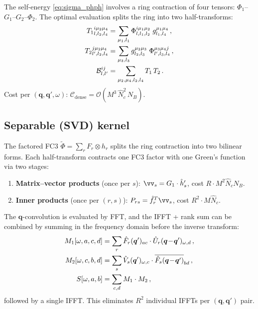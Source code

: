 \documentclass[11pt]{article}
\newcommand{\vc}[1]{\bm{#1}}
\newcommand{\vq}{\vc{q}}
\newcommand{\cO}{\mathcal{O}}
\newcommand{\cC}{\mathcal{C}}
\begin{document}
The self-energy \cref{eq:sigma_phph} involves a ring contraction of
four tensors: $\Phi_1$--$G_1$--$G_2$--$\Phi_2$.  The optimal
evaluation splits the ring into two half-transforms:
\begin{align}
  {T_1}^{i\mu_2\mu_4}_{l,l_2,l_4}
  &= \sum_{\mu_1,l_1}
     \Phi^{i\mu_1\mu_2}_{l,l_1,l_2}\;g^{\mu_1\mu_4}_{l_1,l_4}\,,
  \notag\\
  {T_2}^{j\mu_2\mu_4}_{l',l_2,l_4}
  &= \sum_{\mu_3,l_3}
     g^{\mu_2\mu_3}_{l_2,l_3}\;
     \Phi^{\mu_3\mu_4 j}_{l',l_3,l_4}\,,
  \notag\\
  \mathcal{B}^{ij}_{l,l'}
  &= \sum_{\mu_2,\mu_4,l_2,l_4} T_1\,T_2\,.
  \label{eq:balanced_tree}
\end{align}
Cost per $(\vq, \vq', \omega)$:
$\cC_\mathrm{dense} = \cO(M^3\,\hat{N}_c^2\,N_B)$.

\subsection{Separable (SVD) kernel}
\label{sec:sep_kernel}

The factored FC3 $\tilde\Phi = \sum_r F_r \otimes h_r$ splits the ring
contraction into two bilinear forms.  Each half-transform contracts one
FC3 factor with one Green's function via two stages:
\begin{enumerate}
  \item \textbf{Matrix--vector products} (once per $s$):
        $\vv_s = G_1 \cdot \hat{h}'_s$, cost $R \cdot M^2 \hat{N}_c N_B$.
  \item \textbf{Inner products} (once per $(r,s)$):
        $P_{rs} = \hat{f}_r^T \vv_s$, cost $R^2 \cdot M \hat{N}_c$.
\end{enumerate}
The $\vq$-convolution is evaluated by FFT, and the IFFT + rank sum
can be combined by summing in the frequency domain before the inverse
transform:
\begin{align}
  M_1[\omega,a,c,d] &= \sum_r \hat{F}_r(\vq')_{ac} \cdot
                        \hat{U}_r(\vq\!-\!\vq')_{\omega,d}\,,
  \notag\\
  M_2[\omega,c,b,d] &= \sum_s \hat{V}_s(\vq')_{\omega,c} \cdot
                        \overline{\hat{F}_s(\vq\!-\!\vq')}_{bd}\,,
  \notag\\
  S[\omega,a,b] &= \sum_{c,d} M_1 \cdot M_2\,,
\end{align}
followed by a single IFFT.  This eliminates $R^2$ individual IFFTs per
$(\vq, \vq')$ pair.
\end{document}
